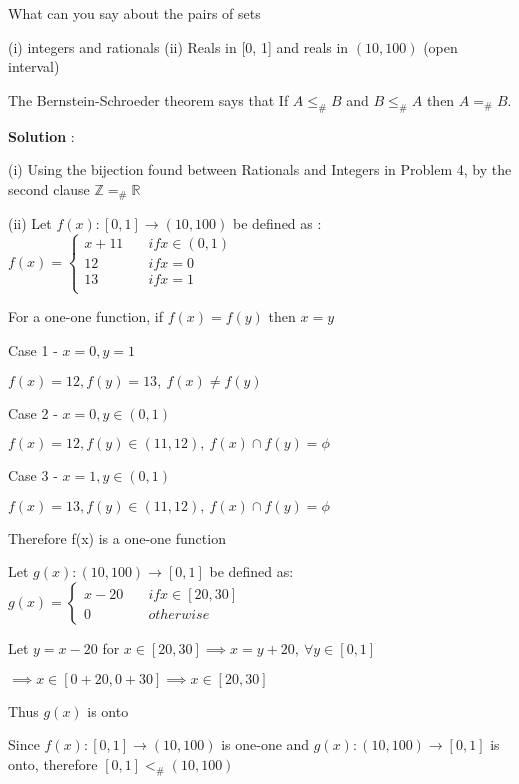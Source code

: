 \documentclass{article}
\begin{document}
What can you say about the pairs of sets

(i) integers and rationals (ii) Reals in [0, 1] and reals in $(10, 100)$ (open interval)

The Bernstein-Schroeder theorem says that If $A \leq_{\#} B$ and $B \leq_{\#} A$ then $A =_{\#} B$.
    
\textbf{Solution} :

    (i) Using the bijection found between Rationals and Integers in Problem 4, by the second clause $\mathbb{Z} =_{\#} \mathbb{R}$
    
    (ii) Let $f(x): [0,1] \to (10, 100)$  be defined as : $f(x) = 
        \begin{cases}
               x+11 & \quad if x \in (0, 1)\\
               12 & \quad if x = 0\\
               13 & \quad if x = 1 \\
            \end{cases}$
            
    \quad For a one-one function, if $f(x) = f(y)$ then $x = y$
    
    \quad Case 1 - $x=0, y=1$
    
    \quad $f(x)=12, f(y)=13, ~ f(x) \neq f(y)$
    
    \quad Case 2 - $x=0, y \in (0, 1)$
    
    \quad $f(x)=12, f(y) \in (11, 12), ~f(x) \cap f(y) = \phi $
        
    \quad Case 3 - $x=1, y \in (0, 1)$
    
    \quad $f(x)=13, f(y) \in (11, 12), ~f(x) \cap f(y) = \phi$
        
    \quad Therefore f(x) is a one-one function 
    
    \quad Let $g(x): (10, 100) \to [0, 1]$  be defined as:
    $g(x) = 
         \begin{cases}
           x-20 &\quad if x \in [20, 30] \\
           0 &\quad otherwise
         \end{cases}$
    
    \quad Let $y=x-20$ for $x \in[20, 30] \implies x=y+20, ~\forall y \in [0, 1] $
    
    \quad $\implies x \in [0+20, 0+30] \implies x \in [20, 30]$
    
    \quad Thus $g(x)$ is onto 
    
    \quad Since $f(x): [0,1] \to (10, 100)$ is one-one and $g(x): (10, 100) \to [0, 1]$ is onto, therefore $[0, 1] <_{\#} (10, 100)$ 
    
\end{document}

